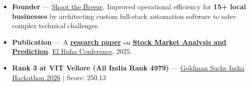 \documentclass[a4paper,10pt]{article}
\newcommand{\ulink}[2]{\href{#1}{#2}}
\begin{document}
\begin{itemize}[nosep, leftmargin=1.5em, itemsep=2pt, topsep=2pt]
  \item {\color[HTML]{0A0A0A}\fontsize{11}{14}\selectfont \textbf{Founder} --- \ulink{https://shoot-the-breeze.vercel.app}{Shoot the Breeze}. Improved operational efficiency for \textbf{15+ local businesses} by architecting custom full-stack automation software to solve complex technical challenges.}
  \item {\color[HTML]{0A0A0A}\fontsize{11}{14}\selectfont \textbf{Publication} --- A \ulink{https://www.elruha.org/_files/ugd/614b1f_6b95e1b697bf452b9907ba46e0151c05.pdf\#page=774}{\textbf{research paper}} on \ulink{https://github.com/su-jin1425/Set-Project}{\textbf{Stock Market Analysis and Prediction}}. \ulink{https://www.elruha.org/congress-books}{El Ruha Conference}, 2025.}
  \item {\color[HTML]{0A0A0A}\fontsize{11}{14}\selectfont \textbf{Rank 3 at VIT Vellore (All India Rank 4979)} --- \ulink{https://www.hackerrank.com/contests/goldman-sachs-india-hackathon-2026-cs/leaderboard}{Goldman Sachs India Hackathon 2026} $|$ Score: 250.13}
\end{itemize}
\end{document}
